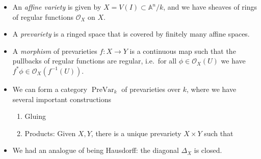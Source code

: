 \begin{itemize}
\item
  An \emph{affine variety} is given by
  \(X = V(I) \subset {\mathbb{A}}^n/k\), and we have sheaves of rings of
  regular functions \({\mathcal{O}}_X\) on \(X\).
\item
  A \emph{prevariety} is a ringed space that is covered by finitely many
  affine spaces.
\item
  A \emph{morphism} of prevarieties \(f:X\to Y\) is a continuous map
  such that the pullbacks of regular functions are regular, i.e.~for all
  \(\phi \in {\mathcal{O}}_X(U)\) we have
  \(f^* \phi \in {\mathcal{O}}_X(f^{-1} (U) )\).
\item
  We can form a category \(\operatorname{PreVar}_k\) of prevarieties
  over \(k\), where we have several important constructions

  \begin{enumerate}
  \def\labelenumi{\arabic{enumi}.}
  \item
    Gluing
  \item
    Products: Given \(X, Y\), there is a unique prevariety \(X\times Y\)
    such that

    \begin{center}
    \end{center}
  \end{enumerate}
\item
  We had an analogue of being Hausdorff: the diagonal \(\Delta_X\) is
  closed.
\end{itemize}

